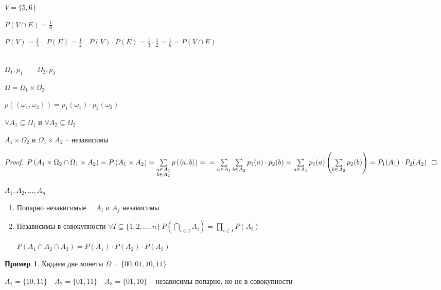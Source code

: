 \documentclass{book}
\theoremstyle{definition}
\newtheorem*{example}{Пример}
\begin{document}
    $V = \{5,6\}$

    $P(V\cap E) = \frac{1}{6}$ 

    $P(V) = \frac{1}{3}\quad P(E) = \frac{1}{2}\quad P(V) \cdot  P(E) = \frac{1}{3}\cdot \frac{1}{2} = \frac{1}{6} = P(V\cap E)$

    \begin{definition}
        $ $\\
        $\Omega_1, p_1\qquad \Omega_2, p_2$

        $\Omega = \Omega_1 \times \Omega_2$

        $p\left( \left<\omega_1, \omega_2 \right> \right)  = p_1\left( \omega_1 \right) \cdot p_2(\omega_2)$
    \end{definition}
    \begin{theorem}
        $\forall A_1\subseteq \Omega_1$ и $\forall  A_2\subseteq \Omega_2$

        $A_1\times \Omega_2$ и $\Omega_1\times A_2$ -- независимы
    \end{theorem}
    \begin{proof}
        $P\left( A_1\times \Omega_2 \cap \Omega_1\times A_2 \right)  = P\left( A_1\times A_2 \right) = \sum\limits_{\substack{a\in A_1\\b\in A_2}} p\left( \left<a, b \right> \right)  = \\ = \sum\limits_{a\in A_1} \sum\limits_{b\in A_2} p_1(a)\cdot p_2(b) = \sum\limits_{a\in A_1}p_1(a)\left( \sum\limits_{b\in A_2} p_2(b) \right) = P_1(A_1)\cdot P_2(A_2)$
    \end{proof}

    \begin{definition}
        $A_1, A_2, \ldots, A_n$

        \begin{enumerate}
            \item Попарно независимые $\quad A_i$ и $A_j$ независимы
            \item Независимы в совокупности $\forall I\subseteq \{1, 2, \ldots, n\}~ P\left( \bigcap\limits_{i\in I}A_i \right)  = \prod\limits_{i\in I} P(A_i)$

                $P(A_1\cap A_2\cap A_3) = P(A_1)\cdot P(A_2)\cdot P(A_3)$
        \end{enumerate}
    \end{definition}

    \begin{example}
        Кидаем две монеты $\Omega = \{00, 01, 10, 11\}$

        $A_1 = \{10,11\}\quad A_2 = \{01,11\}\quad A_3 = \{01,10\}$ -- независимы попарно, но не в совокупности
    \end{example}
\end{document}
